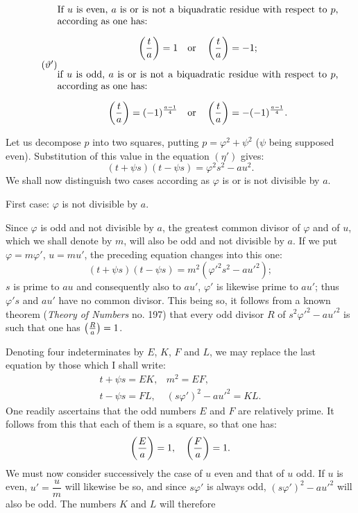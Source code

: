 \begin{equation*}\tag{$\vartheta'$}
\begin{minipage}{0.84\textwidth}
If $u$ is even, $a$ is or is not a biquadratic residue with respect
to $p$, according as one has:
\[
\leg{t}{a}=1\quad\text{or}\quad\leg{t}{a}=-1;
\]
if $u$ is odd, $a$ is or is not a biquadratic residue with respect
to $p$, according as one has:
\[
\leg{t}{a}=(-1)^{\frac{a-1}{4}}\quad\text{or}\quad\leg{t}{a}=-(-1)^{\frac{a-1}{4}}.
\]
\end{minipage}
\end{equation*}
\par\indent
Let us decompose $p$ into two squares, putting $p=\varphi^2+\psi^2$ ($\psi$ being supposed
even). Substitution of this value in the equation $(\eta')$ gives:
\[
(t+\psi s)(t-\psi s)=\varphi^2s^2-au^2.
\]
We shall now distinguish two cases according as $\varphi$ is or is not divisible by $a$.
\par\indent
First case: $\varphi$ is not divisible by $a$.
\par\indent
Since $\varphi$ is odd and not divisible by $a$, the greatest common divisor
of $\varphi$ and of $u$, which we shall denote by $m$, will also be odd and not divisible
by $a$. If we put $\varphi=m\varphi'$, $u=mu'$, the preceding equation
changes into this one:
\[
(t+\psi s)(t-\psi s)=m^2(\varphi'^2s^2-au'^2);
\]
$s$ is prime to $au$ and consequently also to $au'$, $\varphi'$ is likewise prime
to $au'$; thus $\varphi's$ and $au'$ have no common divisor. This being so, it follows
from a known theorem (\emph{Theory of Numbers} no. 197) that every odd divisor
$R$ of $s^2\varphi'^2-au'^2$ is such that one has $\left(\frac{R}{a}\right)=1$.
\par\indent
Denoting four indeterminates by $E$, $K$, $F$ and $L$, we may replace
the last equation by those which I shall write:
\[
\begin{array}{ll}
t+\psi s=EK,&m^2=EF,\\
t-\psi s=FL,&(s\varphi')^2-au'^2=KL.
\end{array}
\]
One readily ascertains that the odd numbers $E$ and $F$ are relatively
prime. It follows from this that each of them is a square, so that one has:
\[
\left(\frac{E}{a}\right)=1,\quad\left(\frac{F}{a}\right)=1.
\]
We must now consider successively the case of $u$ even and that of $u$
odd. If $u$ is even, $u'=\dfrac{u}{m}$ will likewise be so, and since $s\varphi'$ is always
odd, $(s\varphi')^2-au'^2$ will also be odd. The numbers $K$ and $L$ will therefore

